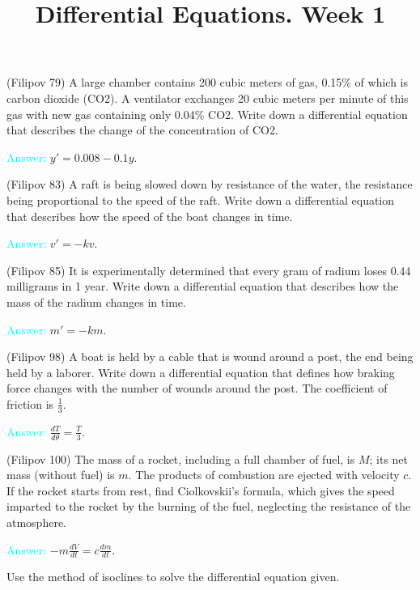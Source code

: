 \documentclass[14pt]{exam}
\title{Differential Equations. Week 1}
\date{}
\begin{document}
	\maketitle
	
	\begin{questions}
		
		\question
		(Filipov 79) A large chamber contains 200 cubic meters of gas, 0.15\% of which is carbon dioxide (CO2). A ventilator exchanges 20 cubic meters per minute of this gas with new gas containing only 0.04\% CO2. Write down a differential equation that describes the change of the concentration of CO2.
		 
		\textcolor{cyan}{Answer:} $y' = 0.008 - 0.1y$.
		 
		\question
		(Filipov 83) A raft is being slowed down by resistance of the water, the resistance being proportional to the speed of the raft. Write down a differential equation that describes how the speed of the boat changes in time.
		
		\textcolor{cyan}{Answer:} $v' = -kv$.
		
		\question
		(Filipov 85) It is experimentally determined that every gram of radium loses 0.44 milligrams in 1 year. Write down a differential equation that describes how the mass of the radium changes in time.
		
		\textcolor{cyan}{Answer:} $m' = -km$.
		
		\question
		(Filipov 98) A boat is held by a cable that is wound around a post, the end being held by a laborer. Write down a differential equation that defines how braking force changes with the number of wounds around the post. The coefficient of friction is $\frac{1}{3}$.
		
		\textcolor{cyan}{Answer:} $\frac{dT}{d\theta} = \frac{T}{3}$.
		
		\question
		(Filipov 100) The mass of a rocket, including a full chamber of fuel, is $M$; its net mass (without fuel) is $m$. The products of combustion are ejected with velocity $c$. If the rocket starts from rest, find Ciolkovskii’s formula, which gives the speed imparted to the rocket by the burning of the fuel, neglecting the resistance of the atmosphere.
		
		\textcolor{cyan}{Answer:} $-m \frac{dV}{dt} = c \frac{dm}{dt}$.
	\end{questions}
	
	Use the method of isoclines to solve the differential equation given.
	
\end{document}
